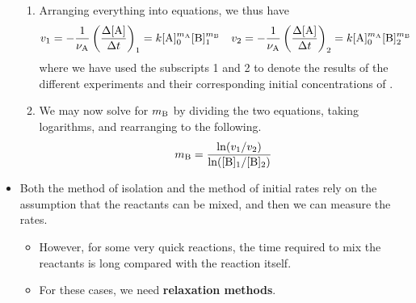 \documentclass[../notes.tex]{subfiles}
\begin{document}
\begin{itemize}
\begin{enumerate}
        \item Arranging everything into equations, we thus have
        \begin{align*}
            v_1 &= -\frac{1}{\nu_{\ce{A}}}\left( \frac{\Delta[\ce{A}]}{\Delta t} \right)_1
            = k[\ce{A}]_0^{m_{\ce{A}}}[\ce{B}]_1^{m_{\ce{B}}}&
            v_2 &= -\frac{1}{\nu_{\ce{A}}}\left( \frac{\Delta[\ce{A}]}{\Delta t} \right)_2
            = k[\ce{A}]_0^{m_{\ce{A}}}[\ce{B}]_2^{m_{\ce{B}}}
        \end{align*}
        where we have used the subscripts 1 and 2 to denote the results of the different experiments and their corresponding initial concentrations of .
        \item We may now solve for $m_{\ce{B}}$ by dividing the two equations, taking logarithms, and rearranging to the following.
        \begin{equation*}
            m_{\ce{B}} = \frac{\ln(v_1/v_2)}{\ln([\ce{B}]_1/[\ce{B}]_2)}
        \end{equation*}
    \end{enumerate}
    \item Both the method of isolation and the method of initial rates rely on the assumption that the reactants can be mixed, and then we can measure the rates.
    \begin{itemize}
        \item However, for some very quick reactions, the time required to mix the reactants is long compared with the reaction itself.
        \item For these cases, we need \textbf{relaxation methods}.
    \end{itemize}
\end{itemize}
\end{document}

